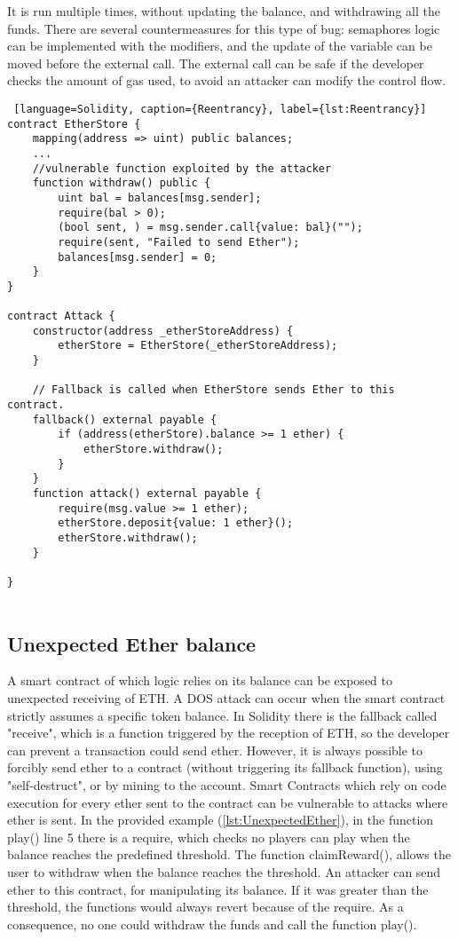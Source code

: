 \documentclass[a4paper,sigconf, language=french,
language=german, language=spanish, language=english]{acmart}
\begin{document}
It is run multiple times, without updating the balance, and withdrawing all the funds. There are several countermeasures for this type of bug: 
semaphores logic can be implemented with the modifiers, and the update of the variable can be moved before the external call. 
The external call can be safe if the developer checks the amount of gas used, to avoid an attacker can modify the control flow. 


\begin{lstlisting} [language=Solidity, caption={Reentrancy}, label={lst:Reentrancy}]
contract EtherStore {
    mapping(address => uint) public balances;
    ...
    //vulnerable function exploited by the attacker
    function withdraw() public {
        uint bal = balances[msg.sender];
        require(bal > 0);
        (bool sent, ) = msg.sender.call{value: bal}("");
        require(sent, "Failed to send Ether");
        balances[msg.sender] = 0;
    }
}

contract Attack {
    constructor(address _etherStoreAddress) {
        etherStore = EtherStore(_etherStoreAddress);
    }

    // Fallback is called when EtherStore sends Ether to this contract.
    fallback() external payable {
        if (address(etherStore).balance >= 1 ether) {
            etherStore.withdraw();
        }
    }
    function attack() external payable {
        require(msg.value >= 1 ether);
        etherStore.deposit{value: 1 ether}();
        etherStore.withdraw();
    }

}
  
\end{lstlisting}

\subsection{Unexpected Ether balance} 
A smart contract of which logic relies on its balance can be exposed to unexpected receiving of ETH.
A DOS attack can occur when the smart contract strictly assumes a specific token balance. 
In Solidity there is the fallback called "receive", which is a function triggered by the reception of ETH, so the developer can prevent a transaction could send ether. However, it is always possible to forcibly send ether to a contract (without triggering its fallback function), using "self-destruct", or by mining to the account. Smart Contracts which rely on code execution for every ether sent to the contract can be vulnerable to attacks where ether is sent.
In the provided example (\autoref{lst:UnexpectedEther}), in the function play() line 5 there is a require, which checks no players can play when the balance 
reaches the predefined threshold. The function claimReward(), allows the user to withdraw when the balance reaches the threshold. 
An attacker can send ether to this contract, for manipulating its balance. If it was greater than the threshold, the functions would always 
revert because of the require. As a consequence, no one could withdraw the funds and call the function play().
\end{document}
